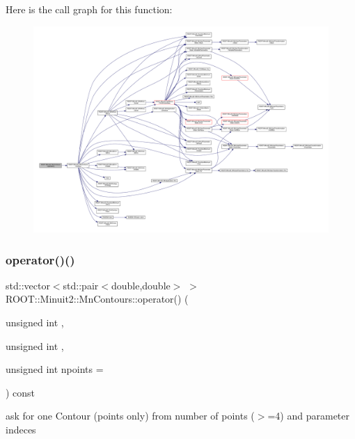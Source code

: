 Here is the call graph for this function\+:\nopagebreak
\begin{figure}[H]
\begin{center}
\leavevmode
\includegraphics[width=350pt]{d9/de7/classROOT_1_1Minuit2_1_1MnContours_a8a56508ee3dd6f22b7378acf8286debe_cgraph}
\end{center}
\end{figure}
\mbox{\label{classROOT_1_1Minuit2_1_1MnContours_a8d3577d628e22ad0513ed1eb71f8619b}} 
\subsubsection{\texorpdfstring{operator()()}{operator()()}\hspace{0.1cm}{\footnotesize\ttfamily [2/2]}}
{\footnotesize\ttfamily std\+::vector$<$std\+::pair$<$double,double$>$ $>$ R\+O\+O\+T\+::\+Minuit2\+::\+Mn\+Contours\+::operator() (\begin{DoxyParamCaption}\item[{unsigned int}]{,  }\item[{unsigned int}]{,  }\item[{unsigned int}]{npoints = {} }\end{DoxyParamCaption}) const}



ask for one Contour (points only) from number of points ($>$=4) and parameter indeces 

\mbox{\label{classROOT_1_1Minuit2_1_1MnContours_a79b55e1c06425b314701c4a3e5b7b009}} 
